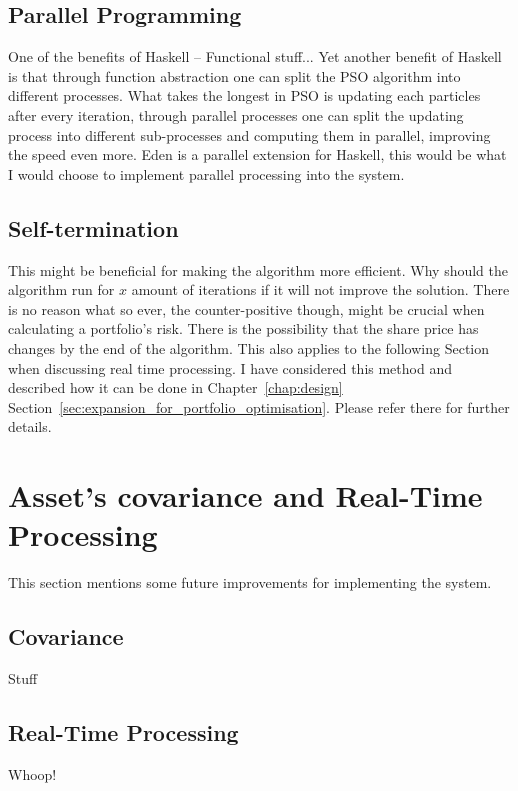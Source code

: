 \documentclass{pdfmx4020}
\begin{document}
    \subsection{Parallel Programming} %
    \label{sub:parallel_programming}
      One of the benefits of Haskell -- Functional stuff...
      Yet another benefit of Haskell is that through function abstraction \cite{haskellPSO} one can split the PSO algorithm into different processes. What takes the longest in PSO is updating each particles after every iteration, through parallel processes one can split the updating process into different sub-processes and computing them in parallel, improving the speed even more. Eden \cite{eden,eden2} is a parallel extension for Haskell, this would be what I would choose to implement parallel processing into the system.
    \subsection{Self-termination} %
    \label{sub:self_termination}
      This might be beneficial for making the algorithm more efficient. Why should the algorithm run for $x$ amount of iterations if it will not improve the solution. There is no reason what so ever, the counter-positive though, might be crucial when calculating a portfolio's risk. There is the possibility that the share price has changes by the end of the algorithm. This also applies to the following Section~ when discussing real time processing. I have considered this method and described how it can be done in Chapter~\ref{chap:design} Section~\ref{sec:expansion_for_portfolio_optimisation}. Please refer there for further details.

  \section{Asset's covariance and Real-Time Processing} %
  \label{sec:asset_s_covariance_and_real_time_processing}
  This section mentions some future improvements for implementing the system.
    \subsection{Covariance} %
    \label{sub:covariance}
      Stuff
    \subsection{Real-Time Processing} %
    \label{sub:real_time_processing}
      Whoop!
\end{document}

